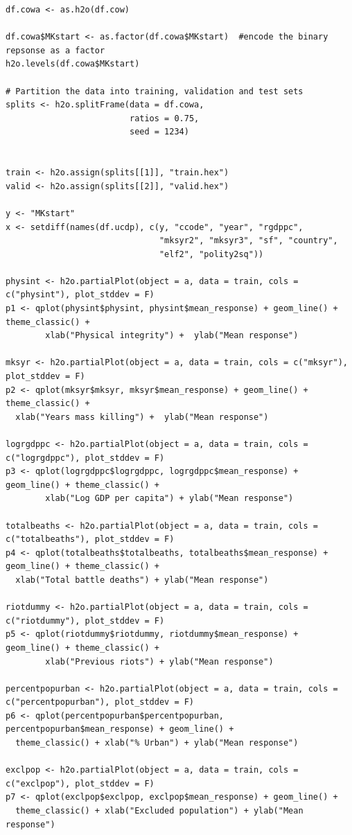 \documentclass[a4paper,12pt]{article}
\begin{document}
\begin{verbatim}
df.cowa <- as.h2o(df.cow)

df.cowa$MKstart <- as.factor(df.cowa$MKstart)  #encode the binary repsonse as a factor
h2o.levels(df.cowa$MKstart)

# Partition the data into training, validation and test sets
splits <- h2o.splitFrame(data = df.cowa, 
                         ratios = 0.75,  
                         seed = 1234) 


train <- h2o.assign(splits[[1]], "train.hex")   
valid <- h2o.assign(splits[[2]], "valid.hex") 

y <- "MKstart"
x <- setdiff(names(df.ucdp), c(y, "ccode", "year", "rgdppc",
                               "mksyr2", "mksyr3", "sf", "country",
                               "elf2", "polity2sq")) 

physint <- h2o.partialPlot(object = a, data = train, cols = c("physint"), plot_stddev = F)
p1 <- qplot(physint$physint, physint$mean_response) + geom_line() + theme_classic() + 
        xlab("Physical integrity") +  ylab("Mean response")

mksyr <- h2o.partialPlot(object = a, data = train, cols = c("mksyr"), plot_stddev = F)
p2 <- qplot(mksyr$mksyr, mksyr$mean_response) + geom_line() + theme_classic() + 
  xlab("Years mass killing") +  ylab("Mean response")

logrgdppc <- h2o.partialPlot(object = a, data = train, cols = c("logrgdppc"), plot_stddev = F)
p3 <- qplot(logrgdppc$logrgdppc, logrgdppc$mean_response) + geom_line() + theme_classic() +
        xlab("Log GDP per capita") + ylab("Mean response")

totalbeaths <- h2o.partialPlot(object = a, data = train, cols = c("totalbeaths"), plot_stddev = F)
p4 <- qplot(totalbeaths$totalbeaths, totalbeaths$mean_response) + geom_line() + theme_classic() +
  xlab("Total battle deaths") + ylab("Mean response")

riotdummy <- h2o.partialPlot(object = a, data = train, cols = c("riotdummy"), plot_stddev = F)
p5 <- qplot(riotdummy$riotdummy, riotdummy$mean_response) + geom_line() + theme_classic() +
        xlab("Previous riots") + ylab("Mean response")

percentpopurban <- h2o.partialPlot(object = a, data = train, cols = c("percentpopurban"), plot_stddev = F)
p6 <- qplot(percentpopurban$percentpopurban, percentpopurban$mean_response) + geom_line() +
  theme_classic() + xlab("% Urban") + ylab("Mean response")

exclpop <- h2o.partialPlot(object = a, data = train, cols = c("exclpop"), plot_stddev = F)
p7 <- qplot(exclpop$exclpop, exclpop$mean_response) + geom_line() +
  theme_classic() + xlab("Excluded population") + ylab("Mean response")


\end{verbatim}
\end{document}
